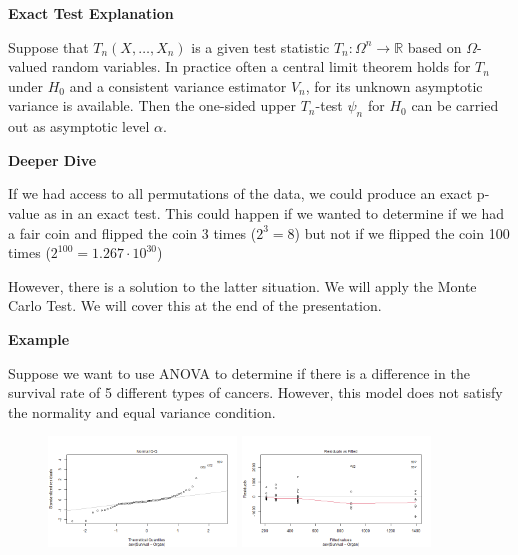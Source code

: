 \documentclass{beamer}
\begin{document}
\begin{frame}{\textbf{Exact Test Explanation}}
    
    Suppose that $T_n(X,\dots,X_n)$ is a given test statistic $T_n:\Omega^n\rightarrow\mathbb{R}$ based on $\Omega$-valued random variables. In practice often a central limit theorem holds for $T_n$ under $H_0$ and a consistent variance estimator $V_n$, for its unknown asymptotic variance is available. Then the one-sided upper $T_n$-test $\psi_n$ for $H_0$ can be carried out as asymptotic level $\alpha$.
    
\end{frame}

\begin{frame}{\textbf{Deeper Dive}}

    If we had access to all permutations of the data, we could produce an exact p-value as in an exact test. This could happen if we wanted to determine if we had a fair coin and flipped the coin 3 times ($2^3=8$) but not if we flipped the coin 100 times ($2^{100}=1.267\cdot10^{30}$)
    
    \newline\quad
    
    However, there is a solution to the latter situation. We will apply the Monte Carlo Test. We will cover this at the end of the presentation.
    
\end{frame}

\begin{frame}{\textbf{Example}}

    Suppose we want to use ANOVA to determine if there is a difference in the survival rate of 5 different types of cancers. However, this model does not satisfy the normality and equal variance condition. 
    \begin{figure}
        \centering
        \includegraphics[width = 5cm]{NormalQQ.png}
        \includegraphics[width = 5cm]{ResidvsFitted.png}
    \end{figure}
\end{frame}
\end{document}
